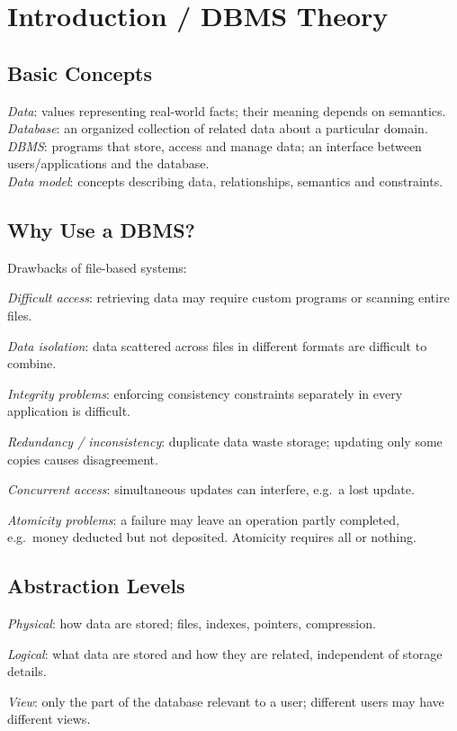 \section{Introduction / DBMS Theory}

\subsection*{Basic Concepts}
\emph{Data}: values representing real-world facts; their meaning depends on semantics.\\
\emph{Database}: an organized collection of related data about a particular domain.\\
\emph{DBMS}: programs that store, access and manage data; an interface between users/applications and the database.\\
\emph{Data model}: concepts describing data, relationships, semantics and constraints.

\subsection*{Why Use a DBMS?}
Drawbacks of file-based systems:\\
\begin{enuminline}
\item \emph{Difficult access}: retrieving data may require custom programs or scanning entire files.
\item \emph{Data isolation}: data scattered across files in different formats are difficult to combine.
\item \emph{Integrity problems}: enforcing consistency constraints separately in every application is difficult.
\item \emph{Redundancy / inconsistency}: duplicate data waste storage; updating only some copies causes disagreement.
\item \emph{Concurrent access}: simultaneous updates can interfere, e.g.\ a lost update.
\item \emph{Atomicity problems}: a failure may leave an operation partly completed, e.g.\ money deducted but not deposited. Atomicity requires all or nothing.
\end{enuminline}

\subsection*{Abstraction Levels}
\begin{enuminline}
\item \emph{Physical}: how data are stored; files, indexes, pointers, compression.
\item \emph{Logical}: what data are stored and how they are related, independent of storage details.
\item \emph{View}: only the part of the database relevant to a user; different users may have different views.
\end{enuminline}

